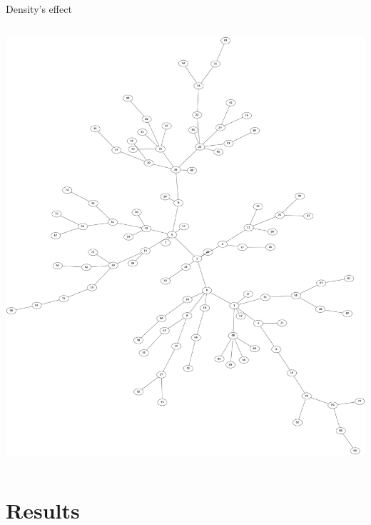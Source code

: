 \documentclass[8pt, handout=show,notes=show]{beamer}
\begin{document}
\begin{frame}{Density's effect}
\begin{columns}
\includegraphics[width=\imgSize]{images/networks/neato_Network_sparsity98.png}\\
\end{columns}

\end{frame}



\section{Results}
\end{document}
